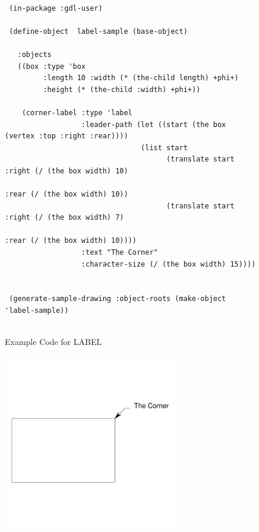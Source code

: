 \documentclass [11pt]{book}
\begin{document}
\begin{itemize}
\begin{description}
\end{description}




\begin{figure}
\begin{lrbox}{\boxedverb}
\begin{minipage}{\linewidth}
{\small

\begin{verbatim}        

 (in-package :gdl-user)
                   
 (define-object  label-sample (base-object)
  
   :objects
   ((box :type 'box
         :length 10 :width (* (the-child length) +phi+)
         :height (* (the-child :width) +phi+))
   
    (corner-label :type 'label
                  :leader-path (let ((start (the box (vertex :top :right :rear))))
                                (list start
                                      (translate start :right (/ (the box width) 10)
                                                       :rear (/ (the box width) 10))
                                      (translate start :right (/ (the box width) 7)
                                                       :rear (/ (the box width) 10))))
                  :text "The Corner"
                  :character-size (/ (the box width) 15))))


 (generate-sample-drawing :object-roots (make-object 'label-sample))


\end{verbatim}}
\end{minipage}
\end{lrbox}
\fbox{\usebox{\boxedverb}}

\caption{Example Code for LABEL}

\label{fig:example-code-LABEL}

\end{figure}

\begin{figure}
\begin{center}
\includegraphics[width=3in,height=3in]{../images/example-LABEL.pdf}
\end{center}


\end{figure}
\end{itemize}
\end{document}
